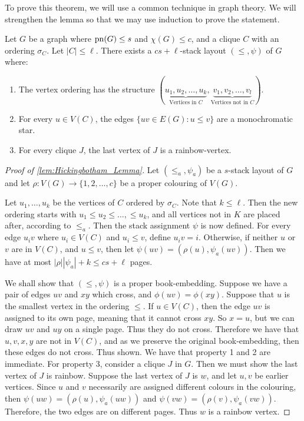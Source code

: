 To prove this theorem, we will use a common technique in graph theory. We will strengthen the lemma so that we may use induction to prove the statement.
\begin{lemma}\label{lem:Hickingbotham_Lemma}
	Let \(G\) be a graph where \(\operatorname{pn}(G) \leq s\) and \(\chi(G) \leq c\), and a clique \(C\) with an ordering \(\sigma_C\). Let \(|C| \leq \ell\). There exists a \(cs + \ell\)-stack layout \((\leq, \psi)\) of \(G\) where:
	\begin{enumerate}
		\item The vertex ordering has the structure \((\underbrace{u_1, u_2, \ldots, u_k}_{\text{Vertices in } C}, \underbrace{v_1, v_2, \ldots, v_l}_{\text{Vertices not in }C})\). 
		\item For every \(u \in V(C)\), the edges \(\lbrace uv \in E(G) : u \leq v \rbrace\) are a monochromatic star. 
		\item For every clique \(J\), the last vertex of \(J\) is a rainbow-vertex. 
	\end{enumerate}
\end{lemma}
\begin{proof}[Proof of \cref{lem:Hickingbotham_Lemma}]
	Let \((\leq_a, \psi_a)\) be a \(s\)-stack layout of \(G\) and let \(\rho: V(G) \rightarrow \lbrace 1, 2, \ldots, c\rbrace\) be a proper colouring of \(V(G)\).
	
	Let \(u_1, \ldots, u_k\) be the vertices of \(C\) ordered by \(\sigma_C\). Note that \(k \leq \ell\). Then the new ordering starts with \(u_1 \leq u_2 \leq \ldots, \leq u_k\), and all vertices not in \(K\) are placed after, according to \(\leq_a\).
	Then the stack assignment \(\psi\) is now defined. For every edge \(u_i v\) where \(u_i \in V(C)\) and \(u_i \leq v\), define \(u_i v = i\). Otherwise, if neither \(u\) or \(v\) are in \(V(C)\), and \(u \leq v\), then let \(\psi(uv) = (\rho(u), \psi_a(uv))\). Then we have at most \(|\rho| |\psi_a| + k \leq cs + \ell\) pages.
	
	We shall show that \((\leq, \psi)\) is a proper book-embedding. Suppose we have a pair of edges \(uv\) and \(xy\) which cross, and \(\phi(uv) = \phi(xy)\). Suppose that \(u\) is the smallest vertex in the ordering \(\leq\). If \(u \in V(C)\), then the edge \(uv\) is assigned to its own page, meaning that it cannot cross \(xy\). So \(x = u\), but we can draw \(uv\) and \(uy\) on a single page. Thus they do not cross. Therefore we have that \(u, v, x, y\) are not in \(V(C)\), and as we preserve the original book-embedding, then these edges do not cross. Thus shown.
	We have that property 1 and 2 are immediate. For property 3, consider a clique \(J\) in \(G\). Then we must show the last vertex of \(J\) is rainbow. Suppose the last vertex of \(J\) is \(w\), and let \(u, v\) be earlier vertices. Since \(u\) and \(v\) necessarily are assigned different colours in the colouring, then \(\psi(uw) = (\rho(u), \psi_a(uw))\) and \(\psi(vw) = (\rho(v), \psi_a(vw))\). Therefore, the two edges are on different pages. Thus \(w\) is a rainbow vertex. 
\end{proof}

